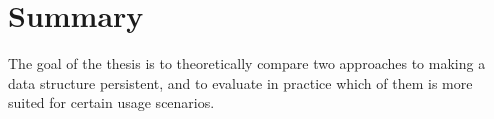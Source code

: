 \chapter{Summary}

The goal of the thesis is to theoretically compare two approaches to making a
data structure persistent, and to evaluate in practice which of them is more
suited for certain usage scenarios.
